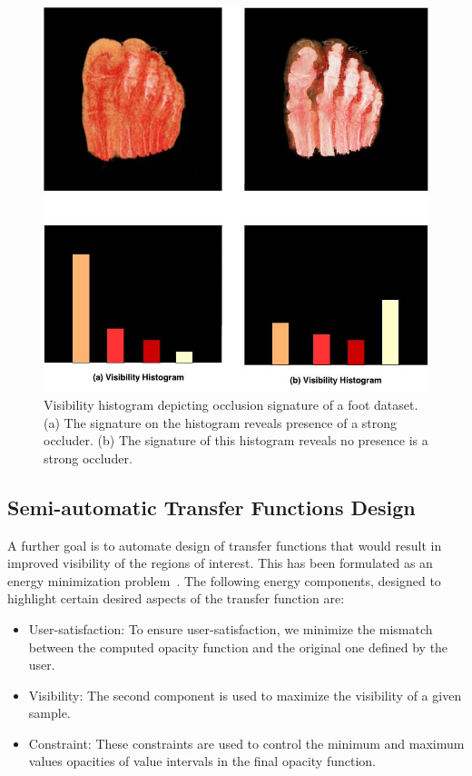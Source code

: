\begin{figure}
\centering
\includegraphics[width=350pt]{Images/occlusion.jpg}
\caption{\label{fig:ray_cast1.jpg} Visibility histogram depicting occlusion signature of a foot dataset. (a) The signature on the histogram reveals presence of a strong occluder. (b) The signature of this histogram reveals no presence is a strong occluder. }
\end{figure}


\subsection{Semi-automatic Transfer Functions Design}

A further goal is to automate design of transfer functions that would result in improved visibility of the regions of interest. This has been  formulated as an energy minimization problem~\cite{vdtf}. The following energy components, designed to highlight certain desired aspects of the transfer function are:

\begin{itemize}
\item User-satisfaction: To ensure user-satisfaction, we minimize the mismatch between the computed opacity function and the original one defined by the user.
\item Visibility: The second component is used to maximize the visibility of a given sample.
\item Constraint: These constraints are used to control the minimum and maximum values opacities of value intervals in the final opacity function. 
\end{itemize}
 
